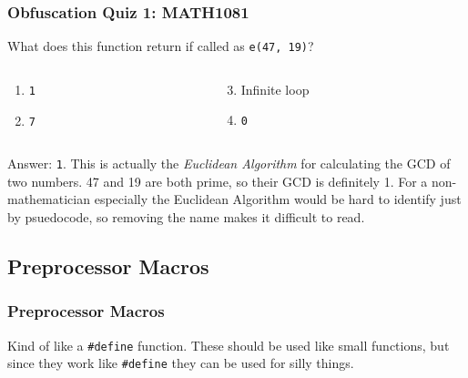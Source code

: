\documentclass[handout,xcolor]{beamer}
\begin{document}
\begin{frame}
	\frametitle{Obfuscation Quiz 1: MATH1081}
	\pause
	
	What does this function return if called as \texttt{e(47, 19)}?
	
	
	\pause
	
	\begin{columns}
		\begin{column}{0.45\textwidth}
			\begin{enumerate}
				\item \texttt{1}
				\pause
				\item \texttt{7}
			\end{enumerate}
		\end{column}
		\pause
		\begin{column}{0.45\textwidth}
			\begin{enumerate}
				\setcounter{enumi}{2}
				\item Infinite loop
				\pause
				\item \texttt{0}
			\end{enumerate}
		\end{column}
	\end{columns}
	\pause
	
	\vspace{0.5cm}
	
	Answer: \texttt{1}. \pause This is actually the \textit{Euclidean Algorithm} for calculating the GCD of two numbers. 47 and 19 are both prime, so their GCD is definitely 1. \pause For a non-mathematician especially the Euclidean Algorithm would be hard to identify just by psuedocode, so removing the name makes it difficult to read.
\end{frame}

\subsection{Preprocessor Macros}

\begin{frame}
	\frametitle{Preprocessor Macros}
	\pause
	
	Kind of like a \texttt{\#define} function. These should be used like small functions, but since they work like \texttt{\#define} they can be used for silly things.
	\pause
	
	\begin{columns}
		\begin{column}{0.45\textwidth}
			\centering
			
		\end{column}
		\pause
		\begin{column}{0.45\textwidth}
			\centering
			
		\end{column}
	\end{columns}
\end{frame}
\end{document}
